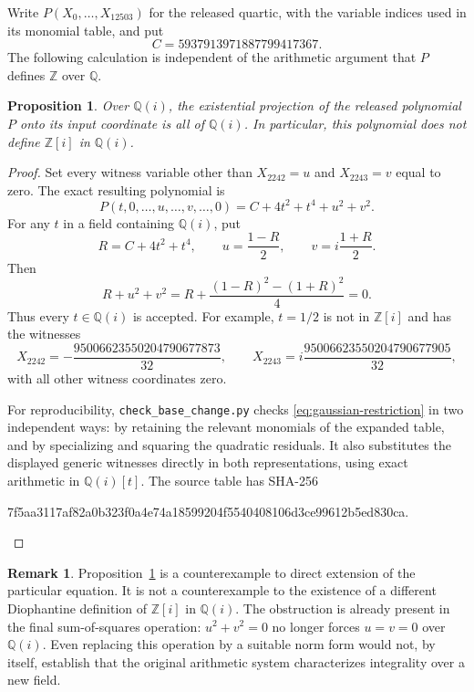 \documentclass[11pt]{article}
\newtheorem{proposition}[theorem]{Proposition}
\theoremstyle{definition}
\newtheorem{remark}[theorem]{Remark}
\begin{document}
Write $P(X_0,\ldots,X_{12503})$ for the released quartic, with the variable
indices used in its monomial table, and put
\[
 C=5937913971887799417367.
\]
The following calculation is independent of the arithmetic argument that
$P$ defines $\mathbb Z$ over $\mathbb Q$.

\begin{proposition}\label{prop:quartic-gaussian}
Over $\mathbb Q(i)$, the existential projection of the released polynomial
$P$ onto its input coordinate is all of $\mathbb Q(i)$.  In particular,
this polynomial does not define $\mathbb Z[i]$ in $\mathbb Q(i)$.
\end{proposition}
\begin{proof}
Set every witness variable other than $X_{2242}=u$ and $X_{2243}=v$ equal
to zero.  The exact resulting polynomial is
\begin{equation}\label{eq:gaussian-restriction}
 P(t,0,\ldots,u,\ldots,v,\ldots,0)=C+4t^2+t^4+u^2+v^2.
\end{equation}
For any $t$ in a field containing $\mathbb Q(i)$, put
\[
 R=C+4t^2+t^4,\qquad u=\frac{1-R}{2},\qquad
 v=i\frac{1+R}{2}.
\]
Then
\[
 R+u^2+v^2
 =R+\frac{(1-R)^2-(1+R)^2}{4}=0.
\]
Thus every $t\in\mathbb Q(i)$ is accepted.  For example, $t=1/2$ is not
in $\mathbb Z[i]$ and has the witnesses
\[
 X_{2242}=-\frac{95006623550204790677873}{32},\qquad
 X_{2243}=i\frac{95006623550204790677905}{32},
\]
with all other witness coordinates zero.

For reproducibility, \texttt{check\_base\_change.py} checks
\eqref{eq:gaussian-restriction} in two independent ways: by retaining the
relevant monomials of the expanded table, and by specializing and squaring
the quadratic residuals.  It also substitutes the displayed generic
witnesses directly in both representations, using exact arithmetic in
$\mathbb Q(i)[t]$.  The source table has SHA-256
\begin{center}\small\ttfamily
7f5aa3117af82a0b323f0a4e74a18599204f5540408106d3ce99612b5ed830ca.
\end{center}
\end{proof}

\begin{remark}
Proposition~\ref{prop:quartic-gaussian} is a counterexample to direct
extension of the particular equation.  It is not a counterexample to
the existence of a different Diophantine definition of
$\mathbb Z[i]$ in $\mathbb Q(i)$.
The obstruction is already present in the final sum-of-squares operation:
$u^2+v^2=0$ no longer forces $u=v=0$ over $\mathbb Q(i)$.
Even replacing this operation by a suitable norm form would not, by
itself, establish that the original arithmetic system characterizes
integrality over a new field.
\end{remark}
\end{document}
